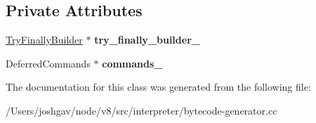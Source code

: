 \subsection*{Private Attributes}
\begin{DoxyCompactItemize}
\item 
\hyperlink{classv8_1_1internal_1_1interpreter_1_1_try_finally_builder}{Try\+Finally\+Builder} $\ast$ {\bfseries try\+\_\+finally\+\_\+builder\+\_\+}\hypertarget{classv8_1_1internal_1_1interpreter_1_1_bytecode_generator_1_1_control_scope_for_try_finally_ad30dae667537e44d33eef7b62ef5b2f5}{}\label{classv8_1_1internal_1_1interpreter_1_1_bytecode_generator_1_1_control_scope_for_try_finally_ad30dae667537e44d33eef7b62ef5b2f5}

\item 
Deferred\+Commands $\ast$ {\bfseries commands\+\_\+}\hypertarget{classv8_1_1internal_1_1interpreter_1_1_bytecode_generator_1_1_control_scope_for_try_finally_a9a8a89dba00e8d2245f03202f882cd5c}{}\label{classv8_1_1internal_1_1interpreter_1_1_bytecode_generator_1_1_control_scope_for_try_finally_a9a8a89dba00e8d2245f03202f882cd5c}

\end{DoxyCompactItemize}


The documentation for this class was generated from the following file\+:\begin{DoxyCompactItemize}
\item 
/\+Users/joshgav/node/v8/src/interpreter/bytecode-\/generator.\+cc\end{DoxyCompactItemize}
